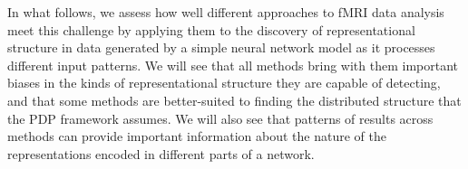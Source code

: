 In what follows, we assess how well different approaches to fMRI data analysis meet this challenge by applying them to the discovery of representational structure in data generated by a simple neural network model as it processes different input patterns. We will see that all methods bring with them important biases in the kinds of representational structure they are capable of detecting, and that some methods are better-suited to finding the distributed structure that the PDP framework assumes. We will also see that patterns of results across methods can provide important information about the nature of the representations encoded in different parts of a network.

